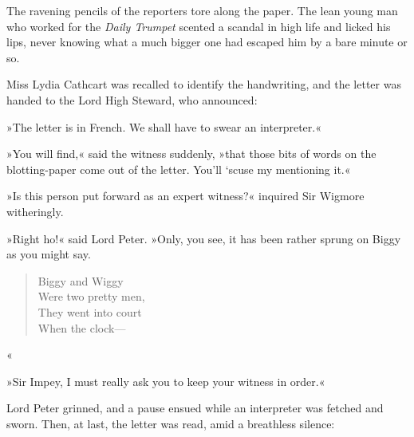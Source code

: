The ravening pencils of the reporters tore along the paper. The lean
young man who worked for the \textit{Daily Trumpet} scented a scandal in high
life and licked his lips, never knowing what a much bigger one had
escaped him by a bare minute or so.

Miss Lydia Cathcart was recalled to identify the handwriting, and the
letter was handed to the Lord High Steward, who announced:

»The letter is in French. We shall have to swear an interpreter.«

»You will find,« said the witness suddenly, »that those bits of
words on the blotting-paper come out of the letter. You'll `scuse my
mentioning it.«

»Is this person put forward as an expert witness?« inquired Sir Wigmore
witheringly.

»Right ho!« said Lord Peter. »Only, you see, it has been rather sprung
on Biggy as you might say.

\begin{verse}
Biggy and Wiggy\\
Were two pretty men,\\
They went into court\\
When the clock—\end{verse}«

»Sir Impey, I must really ask you to keep your witness in order.«

Lord Peter grinned, and a pause ensued while an interpreter was fetched
and sworn. Then, at last, the letter was read, amid a breathless
silence:

